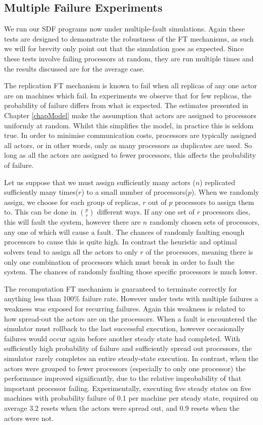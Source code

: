 \subsection{Multiple Failure Experiments}
\label{secExMultiFail}

We run our SDF programs now under multiple-fault simulations.
Again these tests are designed to demonstrate the robustness of the FT mechanisms, as such we will for brevity only point out that the simulation goes as expected.
Since these tests involve failing processors at random, they are run multiple times and the results discussed are for the average case.

The replication FT mechanism is known to fail when all replicas of any one actor are on machines which fail.
In experiments we observe that for few replicas, the probability of failure differs from what is expected.
The estimates presented in Chapter \ref{chapModel} make the assumption that actors are assigned to processors uniformly at random.
Whilst this simplifies the model, in practice this is seldom true.
In order to minimise communication costs, processors are typically assigned all actors, or in other words, only as many processors as duplicates are used.
So long as all the actors are assigned to fewer processors, this affects the probability of failure.

Let us suppose that we must assign sufficiently many actors ($n$) replicated sufficiently many times($r$) to a small number of processors($p$).
When we randomly assign, we choose for each group of replicas, $r$ out of $p$ processors to assign them to.
This can be done in $\binom{p}{r}$ different ways.
If any one set of $r$ processors dies, this will fault the system, however there are $n$ randomly chosen sets of processors, any one of which will cause a fault.
The chances of randomly faulting enough processors to cause this is quite high.
In contrast the heuristic and optimal solvers tend to assign all the actors to only $r$ of the processors, meaning there is only one combination of processors which must break in order to fault the system.
The chances of randomly faulting those specific processors is much lower.

The recomputation FT mechanism is guaranteed to terminate correctly for anything less than 100\% failure rate.
However under tests with multiple failures a weakness was exposed for recurring failures.
Again this weakness is related to how spread-out the actors are on the processors.
When a fault is encountered the simulator must rollback to the last successful execution, however occasionally failures would occur again before another steady state had completed.
With sufficiently high probability of failure and sufficiently spread out processors, the simulator rarely completes an entire steady-state execution.
In contrast, when the actors were grouped to fewer processors (especially to only one processor) the performance improved significantly, due to the relative improbability of that important processor failing.
Experimentally, executing five steady states on five machines with probability failure of 0.1 per machine per steady state, required on average 3.2 resets when the actors were spread out, and 0.9 resets when the actors were not.

